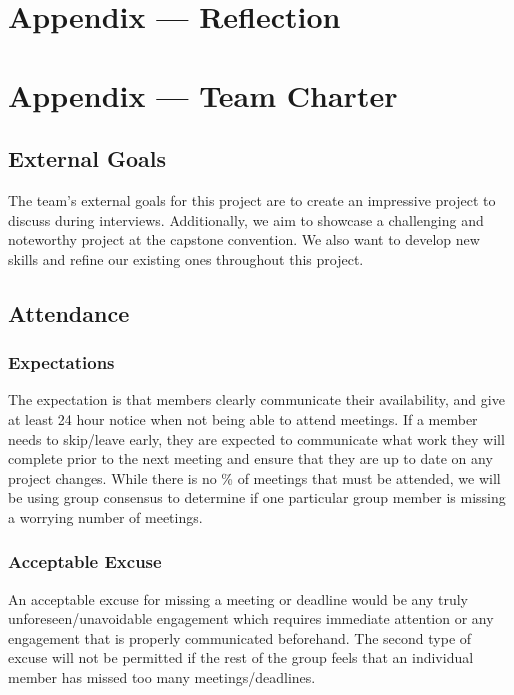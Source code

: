 \documentclass{article}
\begin{document}
\newpage{}

\section*{Appendix --- Reflection}



\newpage{}

\section*{Appendix --- Team Charter}

\subsection*{External Goals}

The team's external goals for this project are to create an impressive project
to discuss during interviews. Additionally, we aim to showcase a challenging
and noteworthy project at the capstone convention. We also want to develop new skills 
and refine our existing ones throughout this project.

\subsection*{Attendance}

\subsubsection*{Expectations}

The expectation is that members clearly communicate their availability,
and give at least 24 hour notice when not being able to attend meetings.
If a member needs to skip/leave early, they are expected to communicate 
what work they will complete prior to the next meeting and ensure that
they are up to date on any project changes. While there is no \% of
meetings that must be attended, we will be using group consensus to
determine if one particular group member is missing a worrying number
of meetings.

\subsubsection*{Acceptable Excuse}

An acceptable excuse for missing a meeting or deadline would be any truly
unforeseen/unavoidable engagement which requires immediate attention or any engagement 
that is properly communicated beforehand. The second type of excuse will not be 
permitted if the rest of the group feels that an individual member has missed too 
many meetings/deadlines.
\end{document}
